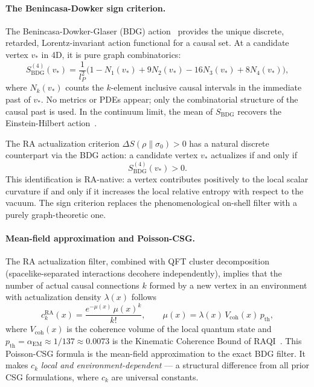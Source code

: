 \documentclass[11pt,a4paper]{article}
\theoremstyle{plain}
\theoremstyle{definition}
\theoremstyle{remark}
\begin{document}
\paragraph{The Benincasa-Dowker sign criterion.}
The Benincasa-Dowker-Glaser (BDG) action~\citep{Benincasa2010} provides the
unique discrete, retarded, Lorentz-invariant action functional for a causal set.
At a candidate vertex $v_*$ in 4D, it is pure graph combinatorics:
\begin{equation}
  S_{\mathrm{BDG}}^{(4)}(v_*)
  = \frac{1}{l_P^2}
    \bigl(1 - N_1(v_*) + 9N_2(v_*) - 16N_3(v_*) + 8N_4(v_*)\bigr),
  \label{eq:BDG}
\end{equation}
where $N_k(v_*)$ counts the $k$-element inclusive causal intervals in the
immediate past of $v_*$. No metrics or PDEs appear; only the combinatorial
structure of the causal past is used. In the continuum limit, the mean of
$S_{\mathrm{BDG}}$ recovers the Einstein-Hilbert action~\citep{Benincasa2010}.

The RA actualization criterion $\Delta S(\rho\|\sigma_0) > 0$ has a natural
discrete counterpart via the BDG action: a candidate vertex $v_*$ actualizes
if and only if
\begin{equation}
  S_{\mathrm{BDG}}^{(4)}(v_*) > 0.
  \label{eq:BDG_filter}
\end{equation}
This identification is RA-native: a vertex contributes positively to the local
scalar curvature if and only if it increases the local relative entropy with
respect to the vacuum. The sign criterion replaces the phenomenological
on-shell filter with a purely graph-theoretic one.

\paragraph{Mean-field approximation and Poisson-CSG.}
The RA actualization filter, combined with QFT cluster decomposition
(spacelike-separated interactions decohere independently), implies that the
number of actual causal connections $k$ formed by a new vertex in an environment
with actualization density $\lambda(x)$ follows
\begin{equation}
  c_k^{\mathrm{RA}}(x) = \frac{e^{-\mu(x)}\,\mu(x)^k}{k!},
  \qquad
  \mu(x) = \lambda(x)\,V_{\mathrm{coh}}(x)\,p_{\mathrm{th}},
  \label{eq:poisson_ck}
\end{equation}
where $V_{\mathrm{coh}}(x)$ is the coherence volume of the local quantum state
and $p_{\mathrm{th}} = \alpha_{\mathrm{EM}} \approx 1/137 \approx 0.0073$ is the Kinematic Coherence Bound of
RAQI~\citep{Sandeman2026RAQI}. This Poisson-CSG formula is the mean-field
approximation to the exact BDG filter. It makes $c_k$ \emph{local and
environment-dependent} --- a structural difference from all prior CSG
formulations, where $c_k$ are universal constants.
\end{document}
